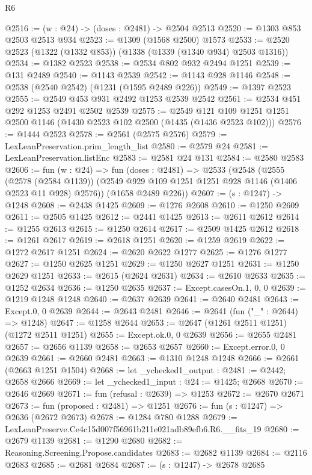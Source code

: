 \begin{lexlean}{R6}
\begin{coremodule}
@2516 := (w : @24) -> (doses : @2481) -> @2504 @2513
@2520 := @1303 @853 @2503 @2513 @934
@2523 := @1309 (@1568 @2500) @1573
@2533 := @2520 @2523 (@1322 (@1332 @853)) (@1338 (@1339 (@1340 @934) @2503 @1316))
@2534 := @1382 @2523
@2538 := @2534 @802 @932 @2494 @1251
@2539 := @131 @2489
@2540 := @1143 @2539
@2542 := @1143 @928 @1146
@2548 := @2538 (@2540 @2542) (@1231 (@1595 @2489 @226))
@2549 := @1397 @2523
@2555 := @2549 @453 @931 @2492 @1253 @2539 @2542
@2561 := @2534 @451 @292 @1253 @2491 @2502 @2539
@2575 := @2549 @121 @109 @1251 @1251 @2500 @1146 (@1430 @2523 @102 @2500 (@1435 (@1436 @2523 @102)))
@2576 := @1444 @2523
@2578 := @2561 (@2575 @2576)
@2579 := LexLeanPreservation.prim_length_list
@2580 := @2579 @24
@2581 := LexLeanPreservation.listEnc
@2583 := @2581 @24 @131
@2584 := @2580 @2583
@2606 := fun (w : @24) =>
  fun (doses : @2481) =>
  @2533
    (@2548
      (@2555
        (@2578 (@2584 @1139))
        (@2549 @929 @109 @1251 @1251 @928 @1146 (@1406 @2523 @11 @928) @2576))
      (@1658 @2489 @226))
@2607 := (s : @1247) -> @1248
@2608 := @2438 @1425
@2609 := @1276 @2608
@2610 := @1250 @2609
@2611 := @2505 @1425
@2612 := @2441 @1425
@2613 := @2611 @2612
@2614 := @1255 @2613
@2615 := @1250 @2614
@2617 := @2509 @1425 @2612
@2618 := @1261 @2617
@2619 := @2618 @1251
@2620 := @1259 @2619
@2622 := @1272 @2617 @1251
@2624 := @2620 @2622 @1277
@2625 := @1276 @1277
@2627 := @1250 @2625 @1251
@2629 := @1250 @2627 @1251
@2631 := @1250 @2629 @1251
@2633 := @2615 (@2624 @2631)
@2634 := @2610 @2633
@2635 := @1252 @2634
@2636 := @1250 @2635
@2637 := Except.casesOn.{1, 0, 0}
@2639 := @1219 @1248 @1248
@2640 := @2637 @2639
@2641 := @2640 @2481
@2643 := Except.{0, 0} @2639
@2644 := @2643 @2481
@2646 := @2641 (fun ("_" : @2644) => @1248)
@2647 := @1258 @2644
@2653 := @2647 (@1261 @2511 @1251) (@1272 @2511 @1251)
@2655 := Except.ok.{0, 0} @2639
@2656 := @2655 @2481
@2657 := @2656 @1139
@2658 := @2653 @2657
@2660 := Except.error.{0, 0} @2639
@2661 := @2660 @2481
@2663 := @1310 @1248 @1248
@2666 := @2661 (@2663 @1251 @1504)
@2668 := let _ychecked1_output : @2481 := @2442; @2658 @2666
@2669 := let _ychecked1_input : @24 := @1425; @2668
@2670 := @2646 @2669
@2671 := fun (refusal : @2639) => @1253
@2672 := @2670 @2671
@2673 := fun (proposed : @2481) => @1251
@2676 := fun (s : @1247) => @2636 (@2672 @2673)
@2678 := @1284 @780 @1288
@2679 := LexLeanPreserve.Ce4c15d007f56961b211e021adb89efb6.R6.__fits_19
@2680 := @2679 @1139
@2681 := @1290 @2680
@2682 := Reasoning.Screening.Propose.candidates
@2683 := @2682 @1139
@2684 := @2116 @2683
@2685 := @2681 @2684
@2687 := (s : @1247) -> @2678 @2685

\end{coremodule}
\end{lexlean}
